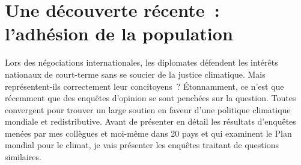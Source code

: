 \documentclass[a5paper,french]{memoir}
\begin{document}
\section{Une découverte récente~: l'adhésion de la population}

Lors des négociations internationales, les diplomates défendent les intérêts nationaux de court-terme sans se soucier de la justice climatique. Mais représentent-ils correctement leur concitoyens~? %
Étonnamment, ce n'est que récemment que des enquêtes d'opinion se sont penchées sur la question. Toutes convergent pour trouver un large soutien en faveur d'une politique climatique mondiale et redistributive. Avant de présenter en détail les résultats d'enquêtes menées par mes collègues et moi-même dans 20 pays et qui examinent le Plan mondial pour le climat, %
je vais présenter les enquêtes traitant de questions similaires. 
\end{document}
